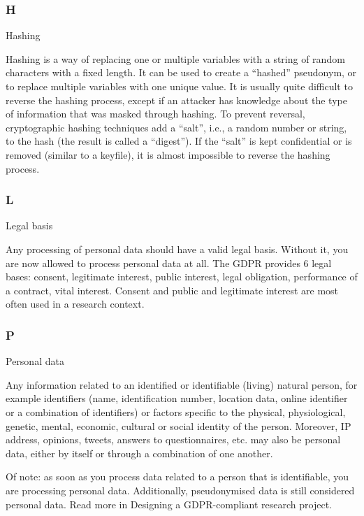 \documentclass[
]{book}
\begin{document}
\hypertarget{h}{%
\subsubsection{H}\label{h}}

Hashing

Hashing is a way of replacing one or multiple variables with a string of
random characters with a fixed length. It can be used to create a ``hashed''
pseudonym, or to replace multiple variables with one unique value. It is
usually quite difficult to reverse the hashing process, except if an attacker
has knowledge about the type of information that was masked through hashing.
To prevent reversal, cryptographic hashing techniques add a ``salt'', i.e., a
random number or string, to the hash (the result is called a ``digest''). If
the ``salt'' is kept confidential or is removed (similar to a keyfile), it is
almost impossible to reverse the hashing process.

\hypertarget{l}{%
\subsubsection{L}\label{l}}

Legal basis

Any processing of personal data should have a valid legal basis. Without it, you are now allowed to process personal data at all.
The GDPR provides 6 legal bases: consent, legitimate interest, public interest, legal obligation, performance of a contract, vital
interest. Consent and public and legitimate interest are most often used in a research context.

\hypertarget{p}{%
\subsubsection{P}\label{p}}

Personal data

Any information related to an identified or identifiable (living) natural person, for example identifiers (name, identification number,
location data, online identifier or a combination of identifiers) or factors specific to the physical, physiological, genetic, mental,
economic, cultural or social identity of the person. Moreover, IP address, opinions, tweets, answers to questionnaires, etc. may also be
personal data, either by itself or through a combination of one another.

Of note: as soon as you process data related to a person that is identifiable, you are processing personal data. Additionally,
pseudonymised data is still considered personal data. Read more in Designing a GDPR-compliant research project.
\end{document}
